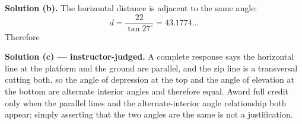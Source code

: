 \documentclass[12pt]{article}
\begin{document}
\noindent\textbf{Solution (b).} The horizontal distance is adjacent to the same
angle:
\[ d = \frac{22}{\tan 27^\circ} = 43.1774\ldots \]
Therefore 

\noindent\textbf{Solution (c) --- instructor-judged.} A complete response says
the horizontal line at the platform and the ground are parallel, and the zip
line is a transversal cutting both, so the angle of depression at the top and
the angle of elevation at the bottom are alternate interior angles and therefore
equal. Award full credit only when the parallel lines and the alternate-interior
angle relationship both appear; simply asserting that the two angles are the
same is not a justification.
\end{document}
